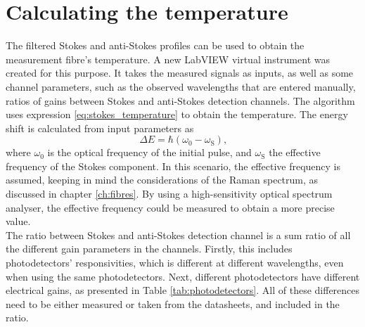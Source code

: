 \documentclass{standalone}
\begin{document}

\section{Calculating the temperature}

The filtered Stokes and anti-Stokes profiles can be used to obtain the measurement fibre's temperature. A new LabVIEW virtual instrument was created for this purpose. It takes the measured signals as inputs, as well as some channel parameters, such as the observed wavelengths that are entered manually, ratios of gains between Stokes and anti-Stokes detection channels. The algorithm uses expression \ref{eq:stokes_temperature} to obtain the temperature. The energy shift is calculated from input parameters as
\begin{equation}
\varDelta E = \hbar (\omega_0 - \omega_\textrm{S}) \textrm{,}
\end{equation}
where $\omega_0$ is the optical frequency of the initial pulse, and $\omega_\textrm{S}$ the effective frequency of the Stokes component. In this scenario, the effective frequency is assumed, keeping in mind the considerations of the Raman spectrum, as discussed in chapter \ref{ch:fibres}. By using a high-sensitivity optical spectrum analyser, the effective frequency could be measured to obtain a more precise value. \\

The ratio between Stokes and anti-Stokes detection channel is a sum ratio of all the different gain parameters in the channels. Firstly, this includes photodetectors' responsivities, which is different at different wavelengths, even when using the same photodetectors. Next, different photodetectors have different electrical gains, as presented in Table \ref{tab:photodetectors}. All of these differences need to be either measured or taken from the datasheets, and included in the ratio. \\
\end{document}
